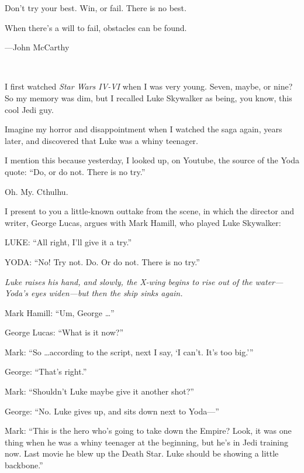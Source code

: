 {
 Don't try your best. Win, or fail. There is no
best.}

\myendsectiontext


\bigskip


{
 When there's a will to fail, obstacles can be
found.}

{\raggedleft
 {}---John McCarthy
\par}


\bigskip

{
 ~}

{
 I first watched \textit{Star Wars IV-VI} when I was very young.
Seven, maybe, or nine? So my memory was dim, but I recalled Luke
Skywalker as being, you know, this cool Jedi guy.}

{
 Imagine my horror and disappointment when I watched the saga
again, years later, and discovered that Luke was a whiny teenager.}

{
 I mention this because yesterday, I looked up, on Youtube, the
source of the Yoda quote: ``Do, or do not. There is no
try.''}

{
 Oh. My. Cthulhu.}

{
 I present to you a little-known outtake from the scene, in which
the director and writer, George Lucas, argues with Mark Hamill, who
played Luke Skywalker:}

{
 LUKE: ``All right, I'll give it a
try.''}

{
 YODA: ``No! Try not. Do. Or do not. There is no
try.''}

{
 \textit{Luke raises his hand, and slowly, the X-wing begins to
rise out of the water---Yoda's eyes widen---but then
the ship sinks again.}}

{
 Mark Hamill: ``Um, George
\ldots''}

{
 George Lucas: ``What is it
now?''}

{
 Mark: ``So \ldots according to the script, next I
say, `I can't. It's too
big.'''}

{
 George: ``That's
right.''}

{
 Mark: ``Shouldn't Luke maybe give
it another shot?''}

{
 George: ``No. Luke gives up, and sits down next
to Yoda---''}

{
 Mark: ``This is the hero who's
going to take down the Empire? Look, it was one thing when he was a
whiny teenager at the beginning, but he's in Jedi
training now. Last movie he blew up the Death Star. Luke should be
showing a little backbone.''}

